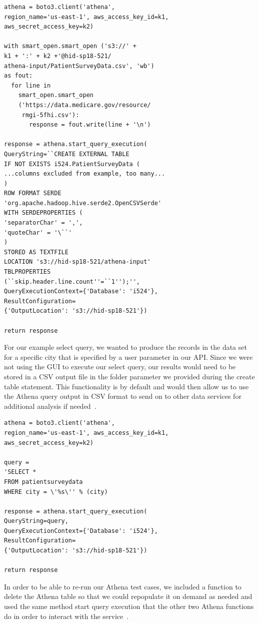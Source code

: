 \begin{verbatim}
athena = boto3.client('athena', 
region_name='us-east-1', aws_access_key_id=k1,
aws_secret_access_key=k2)

with smart_open.smart_open ('s3://' + 
k1 + ':' + k2 +'@hid-sp18-521/
athena-input/PatientSurveyData.csv', 'wb') 
as fout:
  for line in 
    smart_open.smart_open
    ('https://data.medicare.gov/resource/
     rmgi-5fhi.csv'):
       response = fout.write(line + '\n')

response = athena.start_query_execution(
QueryString=``CREATE EXTERNAL TABLE 
IF NOT EXISTS i524.PatientSurveyData (
...columns excluded from example, too many...
)
ROW FORMAT SERDE 
'org.apache.hadoop.hive.serde2.OpenCSVSerde'
WITH SERDEPROPERTIES (
'separatorChar' = ',',
'quoteChar' = '\``'
)
STORED AS TEXTFILE 
LOCATION 's3://hid-sp18-521/athena-input'
TBLPROPERTIES 
(``skip.header.line.count''=``1'');'',
QueryExecutionContext={'Database': 'i524'}, 
ResultConfiguration=
{'OutputLocation': 's3://hid-sp18-521'})

return response
\end{verbatim}

For our example select query, we wanted to produce the records in the data set 
for a specific city that is specified by a user parameter in our API. Since 
we were not using the GUI to execute our select query, our results would need 
to be stored in a CSV output file in the folder parameter we provided during 
the create table statement. This functionality is by default and would then 
allow us to use the Athena query output in CSV format to send on to other data 
services for additional analysis if needed~\cite{hid-sp18-521-boto-athena}.  

\begin{verbatim}
athena = boto3.client('athena', 
region_name='us-east-1', aws_access_key_id=k1,
aws_secret_access_key=k2)

query = 
'SELECT * 
FROM patientsurveydata 
WHERE city = \'%s\'' % (city)

response = athena.start_query_execution(
QueryString=query,
QueryExecutionContext={'Database': 'i524'}, 
ResultConfiguration=
{'OutputLocation': 's3://hid-sp18-521'})

return response
\end{verbatim}

In order to be able to re-run our Athena test cases, we included a function 
to delete the Athena table so that we could repopulate it on demand as needed 
and used the same method start query execution that the other two Athena 
functions do in order to interact with the 
service~\cite{hid-sp18-521-boto-athena}. 

